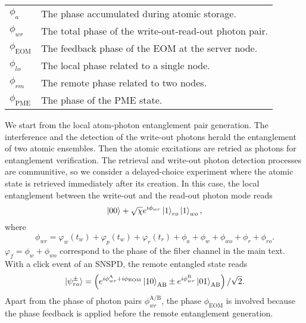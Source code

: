\documentclass[aps,reprint,showpacs,superscriptaddress]{revtex4-2}
\begin{document}
\begin{table*}[ht]
\begin{tabular}[t]{C{2cm} C{10cm}}
	$\phi_{a}$& The phase accumulated during atomic storage.\\
	$\phi_{wr}$& The total phase of the write-out-read-out photon pair.\\
	$\phi_{\textrm{EOM}}$& The feedback phase of the EOM at the server node.\\
	$\phi_{lo}$& The local phase related to a single node.\\
	$\phi_{rm}$& The remote phase related to two nodes.\\
	$\phi_{\textrm{PME}}$& The phase of the PME state.\\
	\bottomrule
	\end{tabular}
	\label{tab:symbols_of_phase}
\end{table*}

We start from the local atom-photon entanglement pair generation. The interference and the detection of the write-out photons herald the entanglement of two atomic ensembles. Then the atomic excitations are retried as photons for entanglement verification. The retrieval and write-out photon detection processes are communitive, so we consider a delayed-choice experiment where the atomic state is retrieved immediately after its creation. In this case, the local entanglement between the write-out and the read-out photon mode reads
\begin{equation}
	\ket{00}+\sqrt{\chi}e^{i\phi_{wr}}\ket{1}_{ro}\ket{1}_{wo},
 \end{equation}
 where
 \begin{equation}
 \phi_{wr}=\varphi_w(t_w)+\varphi_p(t_w)+\varphi_r(t_r)+\phi_a+\phi_w+\phi_{wo}+\phi_r+\phi_{ro}. 
 \end{equation}
 $\varphi_f=\phi_w+\phi_{wo}$ correspond to the phase of the fiber channel in the main text. With a click event of an SNSPD, the remote entangled state reads
 \begin{equation}\label{eq:ent_ro}
	\ket{\psi_{ro}^\pm}=\left(e^{i\phi_{wr}^\textrm{A}+i\phi_{\textrm{EOM}}}\ket{10}_{\textrm{AB}}\pm e^{i\phi_{wr}^\textrm{B}}\ket{01}_{\textrm{AB}}\right)/\sqrt{2}.
 \end{equation}
Apart from the phase of photon pairs $\phi_{wr}^\textrm{A/B}$, the phase $\phi_\textrm{EOM}$ is involved because the phase feedback is applied before the remote entanglement generation.
\end{document}
